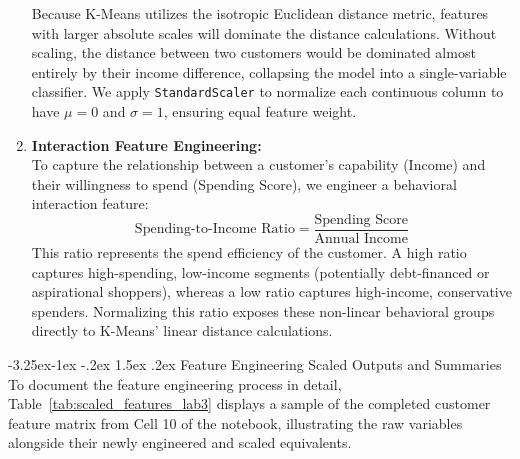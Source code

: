 \documentclass[12pt,a4paper]{article}
\makeatletter
\renewcommand\paragraph{\@startsection{paragraph}{4}{\z@}%
  {-3.25ex\@plus -1ex \@minus -.2ex}%
  {1.5ex \@plus .2ex}%
  {\normalfont\normalsize\bfseries}}
\makeatother
\begin{document}
\begin{enumerate}
    Because K-Means utilizes the isotropic Euclidean distance metric, features with larger absolute scales will dominate the distance calculations. Without scaling, the distance between two customers would be dominated almost entirely by their income difference, collapsing the model into a single-variable classifier. We apply \texttt{StandardScaler} to normalize each continuous column to have $\mu=0$ and $\sigma=1$, ensuring equal feature weight.
    \item \textbf{Interaction Feature Engineering:}\mbox{}\\ To capture the relationship between a customer's capability (Income) and their willingness to spend (Spending Score), we engineer a behavioral interaction feature:
        \[
        \text{Spending-to-Income Ratio} = \frac{\text{Spending Score}}{\text{Annual Income}}
        \]
        This ratio represents the spend efficiency of the customer. A high ratio captures high-spending, low-income segments (potentially debt-financed or aspirational shoppers), whereas a low ratio captures high-income, conservative spenders. Normalizing this ratio exposes these non-linear behavioral groups directly to K-Means' linear distance calculations.
\end{enumerate}

\paragraph{Feature Engineering Scaled Outputs and Summaries}
To document the feature engineering process in detail, Table~\ref{tab:scaled_features_lab3} displays a sample of the completed customer feature matrix from Cell 10 of the notebook, illustrating the raw variables alongside their newly engineered and scaled equivalents.
\begin{table}[H]
\centering
\caption{Preprocessed Customer Feature Matrix including Engineered and Scaled Columns (Sample)}
\label{tab:scaled_features_lab3}
\end{table}
\end{document}
